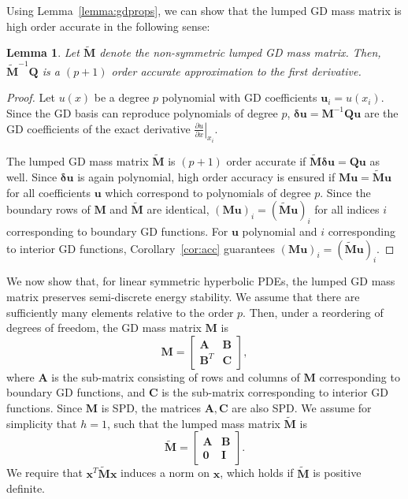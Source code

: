 \documentclass[preprint,10pt]{amsart}
\theoremstyle{lemma}
\newtheorem{lemma}{Lemma}
\theoremstyle{corollary}
\theoremstyle{theorem}
\renewcommand{\tilde}{\widetilde}
\newcommand{\pd}[2]{\frac{\partial#1}{\partial#2}}
\newcommand{\LRl}[1]{\left. #1 \right|}
\begin{document}
Using Lemma~\ref{lemma:gdprops}, we can show that the lumped GD mass matrix is high order accurate in the following sense:
\begin{lemma}
Let $\tilde{\bm{M}}$ denote the non-symmetric lumped GD mass matrix.  Then, $\tilde{\bm{M}}^{-1}\bm{Q}$ is a $(p+1)$ order accurate approximation to the first derivative.  
\end{lemma}
\begin{proof}
Let $u(x)$ be a degree $p$ polynomial with GD coefficients $\bm{u}_i = u(x_i)$.  Since the GD basis can reproduce polynomials of degree $p$, $\bm{\delta u} = \bm{M}^{-1}\bm{Q}\bm{u}$ are the GD coefficients of the exact derivative $\LRl{\pd{u}{x}}_{x_i}$.  

The lumped GD mass matrix $\tilde{\bm{M}}$ is $(p+1)$ order accurate if $\tilde{\bm{M}} \bm{\delta u} = \bm{Q}\bm{u}$ as well.  Since $\bm{\delta u}$ is again polynomial, high order accuracy is ensured if $\bm{M}\bm{u} = \tilde{\bm{M}}\bm{u}$ for all coefficients $\bm{u}$ which correspond to polynomials of degree $p$.  Since the boundary rows of $\bm{M}$ and $\tilde{\bm{M}}$ are identical, $(\bm{M}\bm{u})_i = (\tilde{\bm{M}}\bm{u})_i$ for all indices $i$ corresponding to boundary GD functions.  For $\bm{u}$ polynomial and $i$ corresponding to interior GD functions, Corollary~\ref{cor:acc} guarantees $(\bm{M}\bm{u})_i = (\tilde{\bm{M}}\bm{u})_i$.  
\end{proof}

We now show that, for linear symmetric hyperbolic PDEs, the lumped GD mass matrix preserves semi-discrete energy stability.  We assume that there are sufficiently many elements relative to the order $p$.  Then, under a reordering of degrees of freedom, the GD mass matrix $\bm{M}$ is
\[
\bm{M} = \begin{bmatrix}
\bm{A} & \bm{B}\\
\bm{B}^T & \bm{C}
\end{bmatrix},
\]
where $\bm{A}$ is the sub-matrix consisting of rows and columns of $\bm{M}$ corresponding to boundary GD functions, and $\bm{C}$ is the sub-matrix corresponding to interior GD functions.  Since $\bm{M}$ is SPD, the matrices $\bm{A}, \bm{C}$ are also SPD.  We assume for simplicity that $h = 1$, such that the lumped mass matrix $\tilde{\bm{M}}$ is 
\[
{\tilde{\bm{M}}} = \begin{bmatrix}
\bm{A} & \bm{B}\\
\bm{0} & \bm{I}
\end{bmatrix}.
\]
We require that $\bm{x}^T\tilde{\bm{M}}\bm{x}$ induces a norm on $\bm{x}$, which holds if $\tilde{\bm{M}}$ is positive definite.  
\end{document}
